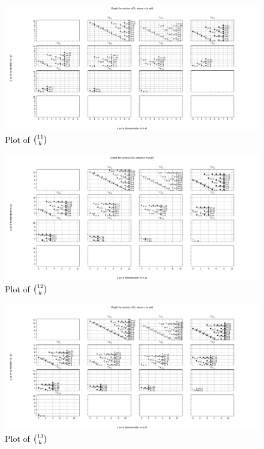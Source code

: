 \documentclass[PermutationsCombinationsWhyWholeNumber.tex]{subfiles}
\begin{document}
\begin{appendices}
\begin{figure}[ph!]	
	\includegraphics[width=\linewidth]{11Ck.png}
	\caption{Plot of $\binom{11}{k}$}
	\label{11Ck}									
\end{figure}
\begin{figure}[ph!]	
	\includegraphics[width=\linewidth]{12Ck.png}
	\caption{Plot of $\binom{12}{k}$}
	\label{12Ck}
\end{figure}	
\begin{figure}[ph!]	
	\includegraphics[width=\linewidth]{13Ck.png}
	\caption{Plot of $\binom{13}{k}$}
	\label{13Ck}									
\end{figure}
\end{appendices}
\end{document}
